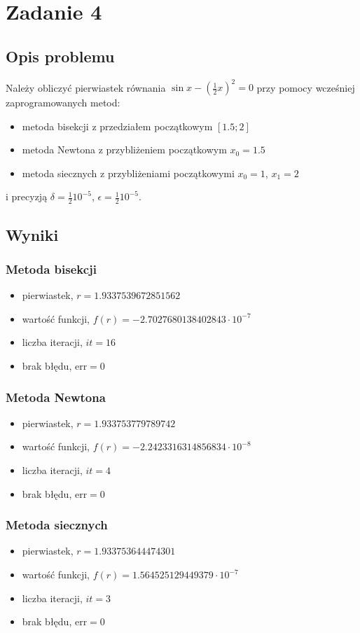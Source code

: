 \documentclass{article}
\begin{document}
\section*{Zadanie 4}
\subsection*{Opis problemu}
	Należy obliczyć pierwiastek równania $\sin x - \left(\frac{1}{2} x\right)^2 = 0$ przy pomocy wcześniej zaprogramowanych metod:
	\begin{itemize}
	    \item metoda bisekcji z przedziałem początkowym $[1.5;2]$
	    \item metoda Newtona z przybliżeniem początkowym $x_0 = 1.5$
	    \item metoda siecznych z przybliżeniami początkowymi $x_0 = 1$, $x_1 = 2$
	\end{itemize}
\noindent i precyzją $\delta = \frac{1}{2} 10^{-5}$, $\epsilon = \frac{1}{2} 10^{-5}$.
\subsection*{Wyniki}
\subsubsection*{Metoda bisekcji}
		\begin{itemize}
			\item pierwiastek, $r = 1.9337539672851562$
		    \item wartość funkcji, $f(r) = -2.7027680138402843 \cdot 10^{-7}$
		    \item liczba iteracji, $it = 16$
		    \item brak błędu, $\mathrm{err} = 0$
		\end{itemize}
\subsubsection*{Metoda Newtona}
		\begin{itemize}
			\item pierwiastek, $r = 1.933753779789742$
		    \item wartość funkcji, $f(r) = -2.2423316314856834 \cdot 10^{-8}$
		    \item liczba iteracji, $it = 4$
		    \item brak błędu, $\mathrm{err} = 0$
		\end{itemize}
\subsubsection*{Metoda siecznych}
		\begin{itemize}
			\item pierwiastek, $r = 1.933753644474301$
		    \item wartość funkcji, $f(r) = 1.564525129449379 \cdot 10^{-7}$
		    \item liczba iteracji, $it = 3$
		    \item brak błędu, $\mathrm{err} = 0$
		\end{itemize}
\end{document}
